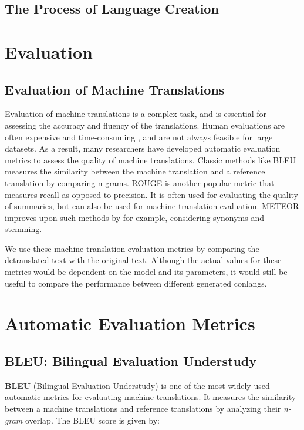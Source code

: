 \subsection{The Process of Language Creation}

\section{Evaluation}
\subsection{Evaluation of Machine Translations}
Evaluation of machine translations is a complex task, and is essential for assessing the accuracy and fluency of the translations. Human evaluations
are often expensive and time-consuming \cite{papineniBLEUMethodAutomatic2002}, and are not always feasible for large datasets. As a result, many researchers 
have developed automatic evaluation metrics to assess the quality of machine translations. Classic methods like BLEU \cite{papineniBLEUMethodAutomatic2002} measures
the similarity between the machine translation and a reference translation by comparing n-grams. ROUGE \cite{linROUGEEvaluationAutomatic2004} is another popular metric that
measures recall as opposed to precision. It is often used for evaluating the quality of summaries, but can also be used for machine translation evaluation. METEOR \cite{banerjeeMETEORAutomaticMetric2005} 
improves upon such methods by for example, considering synonyms and stemming. 

We use these machine translation evaluation metrics by comparing the detranslated text with the original text. Although the actual values for these metrics would be
dependent on the model and its parameters, it would still be useful to compare the performance between different generated conlangs. 

\section{Automatic Evaluation Metrics}

\subsection{BLEU: Bilingual Evaluation Understudy} 
\textbf{BLEU} (Bilingual Evaluation Understudy) \cite{papineniBLEUMethodAutomatic2002} is one of the most widely used automatic metrics for evaluating machine translations. It measures the similarity between a machine translations and reference translations by analyzing their \textit{n-gram} overlap. The BLEU score is given by:

